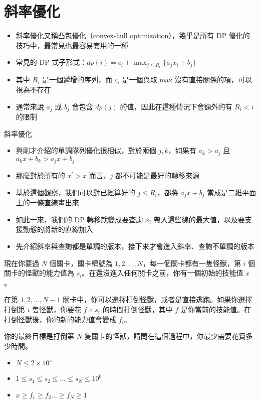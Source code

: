 \documentclass[standalone]{beamer}
\begin{document}
\section{斜率優化}

\begin{frame}{}
  \begin{itemize}
    \item 斜率優化又稱凸包優化（convex-hull optimization），幾乎是所有 DP 優化的技巧中，最常見也最容易套用的一種
    \item 常見的 DP 式子形式：$dp(i) = c_i + \max_{j \leq R_i} \{a_jx_i + b_j\}$
    \item 其中 $R_i$ 是一個遞增的序列，而 $c_i$ 是一個與取 max 沒有直接關係的項，可以視為不存在
    \item 通常來說 $a_j$ 或 $b_j$ 會包含 $dp(j)$ 的值，因此在這種情況下會額外的有 $R_i < i$ 的限制
  \end{itemize}
\end{frame}

\begin{frame}{斜率優化}
  \begin{itemize}
    \item 與剛才介紹的單調隊列優化很相似，對於兩個 $j, k$，如果有 $a_k > a_j$ 且 $a_kx + b_k > a_jx + b_j$
    \item 那麼對於所有的 $x^\prime > x$ 而言，$j$ 都不可能是最好的轉移來源
    \item 基於這個觀察，我們可以對已經算好的 $j \leq R_i$，都將 $a_jx + b_j$ 當成是二維平面上的一條直線畫出來
    \item 如此一來，我們的 DP 轉移就變成要查詢 $x_i$ 帶入這些線的最大值，以及要支援動態的將新的直線加入
    \item 先介紹斜率與查詢都是單調的版本，接下來才會進入斜率、查詢不單調的版本
  \end{itemize}
\end{frame}

\begin{frame}{}
  \begin{problem}
    現在你要過 $N$ 個關卡，關卡編號為 $1, 2, \dots, N$，每一個關卡都有一隻怪獸，第 $i$ 個關卡的怪獸的能力值為 $s_i$。在還沒進入任何關卡之前，你有一個初始的技能值 $x$。

    在第 $1, 2, \dots, N - 1$ 關卡中，你可以選擇打倒怪獸，或者是直接逃跑。如果你選擇打倒第 $i$ 隻怪獸，你要花 $f \times s_i$ 的時間打倒怪獸，其中 $f$ 是你當前的技能值。在打倒怪獸後，你的新的能力值會變成 $f_i$。

    你的最終目標是打倒第 $N$ 隻關卡的怪獸，請問在這個過程中，你最少需要花費多少時間。

    \begin{itemize}
      \item $N \leq 2 \times 10^5$
      \item $1 \leq s_1 \leq s_2 \leq \dots \leq s_N \leq 10^6$
      \item $x \geq f_1 \geq f_2 \dots \geq f_N \geq 1$
    \end{itemize}
  \end{problem}
\end{frame}
\end{document}
